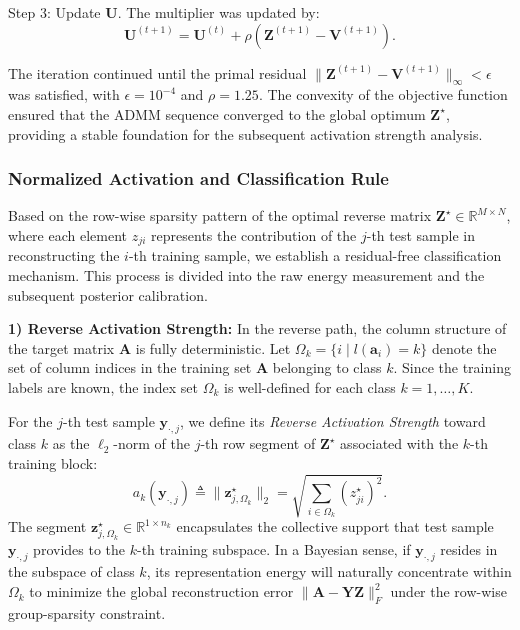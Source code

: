\documentclass[10pt,comsoc]{IEEEtran}
\begin{document}
Step 3: Update $\mathbf{U}$. The multiplier was updated by:
\begin{equation}
\mathbf{U}^{(t+1)} = \mathbf{U}^{(t)} + \rho (\mathbf{Z}^{(t+1)} - \mathbf{V}^{(t+1)}).
\end{equation}

The iteration continued until the primal residual $\|\mathbf{Z}^{(t+1)} - \mathbf{V}^{(t+1)}\|_\infty < \epsilon$ was satisfied, with $\epsilon = 10^{-4}$ and $\rho = 1.25$. The convexity of the objective function ensured that the ADMM sequence converged to the global optimum $\mathbf{Z}^\star$, providing a stable foundation for the subsequent activation strength analysis.


\subsubsection{Normalized Activation and Classification Rule}
Based on the row-wise sparsity pattern of the optimal reverse matrix $\mathbf{Z}^\star \in \mathbb{R}^{M \times N}$, where each element $z_{ji}$ represents the contribution of the $j$-th test sample in reconstructing the $i$-th training sample, we establish a residual-free classification mechanism. This process is divided into the raw energy measurement and the subsequent posterior calibration.

\textbf{1) Reverse Activation Strength:} 
In the reverse path, the column structure of the target matrix $\mathbf{A}$ is fully deterministic. Let $\Omega_k = \{i \mid l(\mathbf{a}_i) = k\}$ denote the set of column indices in the training set $\mathbf{A}$ belonging to class $k$. Since the training labels are known, the index set $\Omega_k$ is well-defined for each class $k = 1, \dots, K$. 

For the $j$-th test sample $\mathbf{y}_{\cdot,j}$, we define its \textit{Reverse Activation Strength} toward class $k$ as the $\ell_2$-norm of the $j$-th row segment of $\mathbf{Z}^\star$ associated with the $k$-th training block:
\begin{equation}
\label{eq:a_k_precise}
a_k(\mathbf{y}_{\cdot,j}) \triangleq \|\mathbf{z}_{j, \Omega_k}^\star\|_2 = \sqrt{\sum_{i \in \Omega_k} (z_{ji}^\star)^2}.
\end{equation}
The segment $\mathbf{z}_{j, \Omega_k}^\star \in \mathbb{R}^{1 \times n_k}$ encapsulates the collective support that test sample $\mathbf{y}_{\cdot,j}$ provides to the $k$-th training subspace. In a Bayesian sense, if $\mathbf{y}_{\cdot,j}$ resides in the subspace of class $k$, its representation energy will naturally concentrate within $\Omega_k$ to minimize the global reconstruction error $\|\mathbf{A} - \mathbf{YZ}\|_F^2$ under the row-wise group-sparsity constraint.
\end{document}
